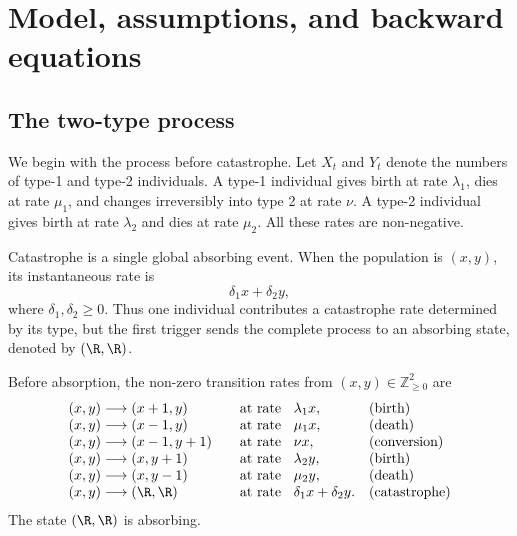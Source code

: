 \section{Model, assumptions, and backward equations}
\label{sec:model}

\subsection{The two-type process}

We begin with the process before catastrophe. Let $X_t$ and $Y_t$ denote the numbers of type-1 and type-2 individuals. A type-1 individual gives birth at rate $\lambda_1$, dies at rate $\mu_1$, and changes irreversibly into type 2 at rate $\nu$. A type-2 individual gives birth at rate $\lambda_2$ and dies at rate $\mu_2$. All these rates are non-negative.

Catastrophe is a single global absorbing event. When the population is $(x,y)$, its instantaneous rate is
\begin{equation}
\label{eq:catastrophe-rate}
\delta_1x+\delta_2y,
\end{equation}
where $\delta_1,\delta_2\geq0$. Thus one individual contributes a catastrophe rate determined by its type, but the first trigger sends the complete process to an absorbing state, denoted by $(\R,\R)$.

\begin{definition}
Before absorption, the non-zero transition rates from $(x,y)\in\mathbb Z_{\geq0}^2$ are
\begin{equation*}
\begin{array}{@{}r@{\;}l@{\qquad}l@{\hspace{0.9em}}l@{\quad}l@{}}
(x,y)&\longrightarrow(x+1,y)&\text{at rate}&\lambda_1x,&\text{(birth)}\\
(x,y)&\longrightarrow(x-1,y)&\text{at rate}&\mu_1x,&\text{(death)}\\
(x,y)&\longrightarrow(x-1,y+1)&\text{at rate}&\nu x,&\text{(conversion)}\\
(x,y)&\longrightarrow(x,y+1)&\text{at rate}&\lambda_2y,&\text{(birth)}\\
(x,y)&\longrightarrow(x,y-1)&\text{at rate}&\mu_2y,&\text{(death)}\\
(x,y)&\longrightarrow(\R,\R)&\text{at rate}&\delta_1x+\delta_2y.&\text{(catastrophe)}
\end{array}
\end{equation*}
The state $(\R,\R)$ is absorbing.
\end{definition}

